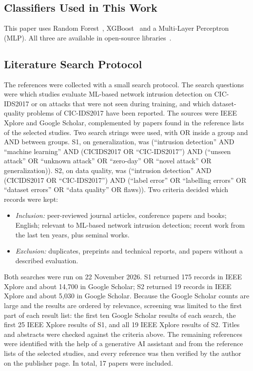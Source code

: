 \documentclass[conference]{IEEEtran}
\begin{document}
\subsection{Classifiers Used in This Work}
This paper uses Random Forest~\cite{breiman2001}, XGBoost~\cite{chen2016} and a Multi-Layer Perceptron (MLP). All three are available in open-source libraries~\cite{pedregosa2011}.

\subsection{Literature Search Protocol}
The references were collected with a small search protocol. The search questions were which studies evaluate ML-based network intrusion detection on CIC-IDS2017 or on attacks that were not seen during training, and which dataset-quality problems of CIC-IDS2017 have been reported. The sources were IEEE Xplore and Google Scholar, complemented by papers found in the reference lists of the selected studies. Two search strings were used, with OR inside a group and AND between groups. S1, on generalization, was (``intrusion detection'' AND ``machine learning'' AND (CICIDS2017 OR ``CIC-IDS2017'') AND (``unseen attack'' OR ``unknown attack'' OR ``zero-day'' OR ``novel attack'' OR generalization)). S2, on data quality, was (``intrusion detection'' AND (CICIDS2017 OR ``CIC-IDS2017'') AND (``label error'' OR ``labelling errors'' OR ``dataset errors'' OR ``data quality'' OR flaws)). Two criteria decided which records were kept:
\begin{itemize}
\item \emph{Inclusion:} peer-reviewed journal articles, conference papers and books; English; relevant to ML-based network intrusion detection; recent work from the last ten years, plus seminal works.
\item \emph{Exclusion:} duplicates, preprints and technical reports, and papers without a described evaluation.
\end{itemize}
Both searches were run on 22 November 2026. S1 returned 175 records in IEEE Xplore and about 14{,}700 in Google Scholar; S2 returned 19 records in IEEE Xplore and about 5{,}030 in Google Scholar. Because the Google Scholar counts are large and the results are ordered by relevance, screening was limited to the first part of each result list: the first ten Google Scholar results of each search, the first 25 IEEE Xplore results of S1, and all 19 IEEE Xplore results of S2. Titles and abstracts were checked against the criteria above. The remaining references were identified with the help of a generative AI assistant and from the reference lists of the selected studies, and every reference was then verified by the author on the publisher page. In total, 17 papers were included.
\end{document}
